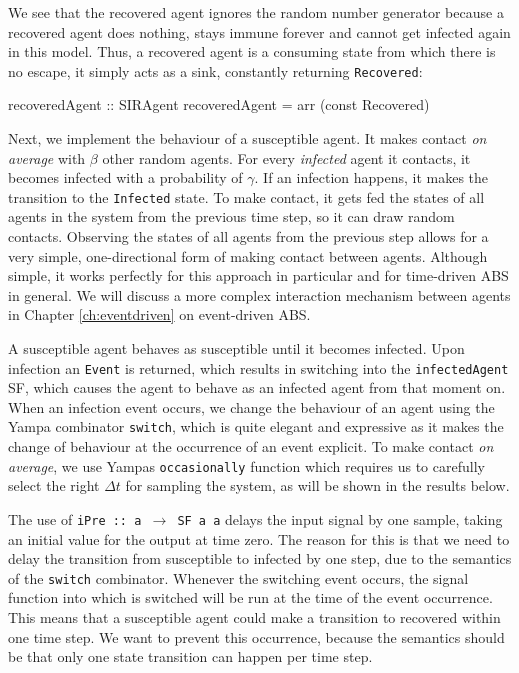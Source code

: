 We see that the recovered agent ignores the random number generator because a recovered agent does nothing, stays immune forever and cannot get infected again in this model. Thus, a recovered agent is a consuming state from which there is no escape, it simply acts as a sink, constantly returning \texttt{Recovered}:

\begin{HaskellCode}
recoveredAgent :: SIRAgent
recoveredAgent = arr (const Recovered)
\end{HaskellCode}

Next, we implement the behaviour of a susceptible agent. It makes contact \textit{on average} with $\beta$ other random agents. For every \textit{infected} agent it contacts, it becomes infected with a probability of $\gamma$. If an infection happens, it makes the transition to the \texttt{Infected} state. To make contact, it gets fed the states of all agents in the system from the previous time step, so it can draw random contacts. Observing the states of all agents from the previous step allows for a very simple, one-directional form of making contact between agents. Although simple, it works perfectly for this approach in particular and for time-driven ABS in general. We will discuss a more complex interaction mechanism between agents in Chapter \ref{ch:eventdriven} on event-driven ABS.

A susceptible agent behaves as susceptible until it becomes infected. Upon infection an \texttt{Event} is returned, which results in switching into the \texttt{infectedAgent} SF, which causes the agent to behave as an infected agent from that moment on. When an infection event occurs, we change the behaviour of an agent using the Yampa combinator \texttt{switch}, which is quite elegant and expressive as it makes the change of behaviour at the occurrence of an event explicit. To make contact \textit{on average}, we use Yampas \texttt{occasionally} function which requires us to carefully select the right $\Delta t$ for sampling the system, as will be shown in the results below. 

The use of \texttt{iPre :: a $\rightarrow$ SF a a} delays the input signal by one sample, taking an initial value for the output at time zero. The reason for this is that we need to delay the transition from susceptible to infected by one step, due to the semantics of the \texttt{switch} combinator. Whenever the switching event occurs, the signal function into which is switched will be run at the time of the event occurrence. This means that a susceptible agent could make a transition to recovered within one time step. We want to prevent this occurrence, because the semantics should be that only one state transition can happen per time step.

